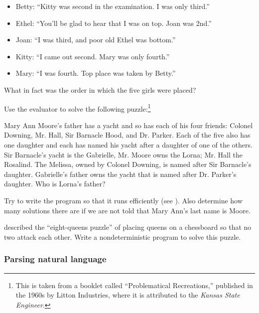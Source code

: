 \begin{exerciseGroup}
\begin{itemize}
\item
Betty: ``Kitty was second in the examination.  I was only third.''

\item
Ethel: ``You'll be glad to hear that I was on top.  Joan was 2nd.''

\item
Joan: ``I was third, and poor old Ethel was bottom.''

\item
Kitty: ``I came out second.  Mary was only fourth.''

\item
Mary: ``I was fourth.  Top place was taken by Betty.''
\end{itemize}

What in fact was the order in which the five girls were placed?

\label{Exercise 4.43}
 Use the  evaluator to
solve the following puzzle:\footnote{This is taken from a booklet called
``Problematical Recreations,'' published in the 1960s by Litton Industries,
where it is attributed to the \textit{Kansas State Engineer}.}

Mary Ann Moore's father has a yacht and so has each of his four friends:
Colonel Downing, Mr. Hall, Sir Barnacle Hood, and Dr.  Parker.  Each of the
five also has one daughter and each has named his yacht after a daughter of one
of the others.  Sir Barnacle's yacht is the Gabrielle, Mr. Moore owns the
Lorna; Mr. Hall the Rosalind.  The Melissa, owned by Colonel Downing, is named
after Sir Barnacle's daughter.  Gabrielle's father owns the yacht that is named
after Dr.  Parker's daughter.  Who is Lorna's father?

Try to write the program so that it runs efficiently (see ).
Also determine how many solutions there are if we are not told that Mary Ann's
last name is Moore.

\label{Exercise 4.44}
  described the
``eight-queens puzzle'' of placing queens on a chessboard so that no two attack
each other.  Write a nondeterministic program to solve this puzzle.
\end{exerciseGroup}

\subsubsection*{Parsing natural language}

